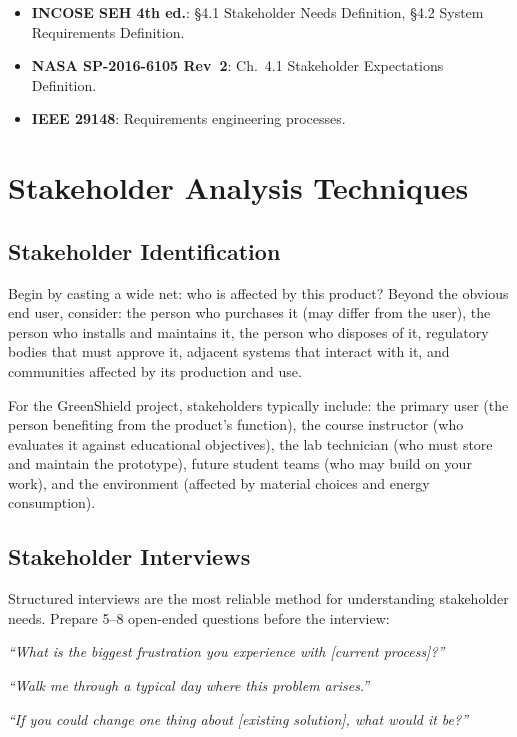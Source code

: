 \documentclass[11pt,letterpaper,twoside,openany]{book}
\begin{document}
\begin{keyconceptbox}
\begin{itemize}[nosep,leftmargin=1.5em]
\item \textbf{INCOSE SEH 4th ed.}: \S4.1 Stakeholder Needs Definition, \S4.2 System Requirements Definition.
\item \textbf{NASA SP-2016-6105 Rev~2}: Ch.~4.1 Stakeholder Expectations Definition.
\item \textbf{IEEE 29148}: Requirements engineering processes.
\end{itemize}
\end{keyconceptbox}

\section{Stakeholder Analysis Techniques}
\subsection{Stakeholder Identification}
Begin by casting a wide net: who is affected by this product? Beyond the obvious end user, consider: the person who purchases it (may differ from the user), the person who installs and maintains it, the person who disposes of it, regulatory bodies that must approve it, adjacent systems that interact with it, and communities affected by its production and use.

For the GreenShield project, stakeholders typically include: the primary user (the person benefiting from the product's function), the course instructor (who evaluates it against educational objectives), the lab technician (who must store and maintain the prototype), future student teams (who may build on your work), and the environment (affected by material choices and energy consumption).

\subsection{Stakeholder Interviews}
Structured interviews are the most reliable method for understanding stakeholder needs. Prepare 5--8 open-ended questions before the interview:

\emph{``What is the biggest frustration you experience with [current process]?''}

\emph{``Walk me through a typical day where this problem arises.''}

\emph{``If you could change one thing about [existing solution], what would it be?''}
\end{document}
